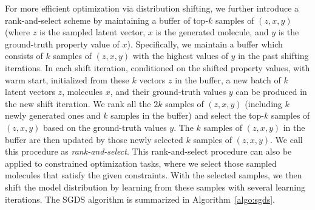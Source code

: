 \documentclass[accepted]{uai2023} %
\begin{document}
For more efficient optimization via distribution shifting, we further introduce a rank-and-select scheme by maintaining a buffer of top-$k$ samples of $(z, x, y)$ (where $z$ is the sampled latent vector, $x$ is the generated molecule, and $y$ is the ground-truth property value of $x$). Specifically, we maintain a buffer which consists of $k$ samples of $(z, x, y)$ with the highest values of $y$ in the past shifting iterations. In each shift iteration, conditioned on the shifted property values, with warm start, initialized from these $k$ vectors $z$ in the buffer, a new  batch of $k$ latent vectors $z$, molecules $x$, and their ground-truth values $y$ can be produced in the new shift iteration. We rank all the $2k$ samples of $(z, x, y)$ (including $k$ newly generated ones and $k$ samples in the buffer) and select the top-$k$ samples of $(z, x, y)$ based on the ground-truth values $y$. The $k$ samples of $(z, x, y)$ in the buffer are then updated by those newly selected $k$ samples of $(z, x, y)$. We call this procedure as \textit{rank-and-select}. This rank-and-select procedure can also be applied to constrained optimization tasks, where we select those sampled molecules that satisfy the given constraints. With the selected samples, we then shift the model distribution by learning from these samples with several learning iterations. The SGDS algorithm is summarized in Algorithm~\ref{algo:sgds}.


\begin{algorithm}
	 
	\DontPrintSemicolon
	\caption{SGDS for single property optimization.}
	\label{algo:sgds}
\end{algorithm}
\end{document}
